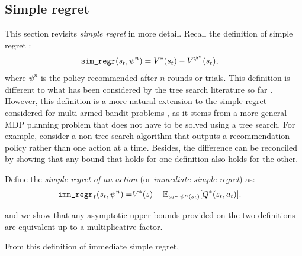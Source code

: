 
        \subsection{Simple regret} \label{app:simple_regret_results}

    
            This section revisits \textit{simple regret} in more detail. Recall the definition of simple regret :
            \begin{align} 
                {\textnormal{\texttt{sim\_regr}}}(s_t,\psi^n) &= V^*(s_t) - V^{\psi^n}(s_t), 
            \end{align}
            where $\psi^n$ is the policy recommended after $n$ rounds or trials. This definition is different to what has been considered by the tree search literature so far . However, this definition is a more natural extension to the simple regret considered for multi-armed bandit problems , as it stems from a more general MDP planning problem that does not have to be solved using a tree search. For example, consider a non-tree search algorithm that outputs a recommendation policy rather than one action at a time. Besides, the difference can be reconciled by showing that any bound that holds for one definition also holds for the other. 
            
            Define the \textit{simple regret of an action} (or \textit{immediate simple regret}) as:
            \begin{align}
                {\textnormal{\texttt{imm\_regr}}}_I(s_t,\psi^n) =& V^*(s) - \mathbb{E}_{a_t\sim\psi^n(s_t)}[Q^*(s_t,a_t)].
            \end{align}
            
            and we show that any asymptotic upper bounds provided on the two definitions are equivalent up to a multiplicative factor. 
    
    
    
    
    
    
            From this definition of immediate simple regret, 
        
